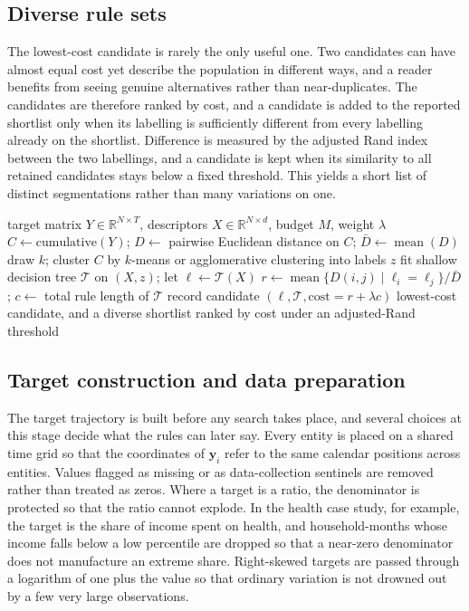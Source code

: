 \subsection{Diverse rule sets}
\label{sec:diversity}

The lowest-cost candidate is rarely the only useful one. Two candidates can have almost equal cost yet describe the population in different ways, and a reader benefits from seeing genuine alternatives rather than near-duplicates. The candidates are therefore ranked by cost, and a candidate is added to the reported shortlist only when its labelling is sufficiently different from every labelling already on the shortlist. Difference is measured by the adjusted Rand index between the two labellings, and a candidate is kept when its similarity to all retained candidates stays below a fixed threshold. This yields a short list of distinct segmentations rather than many variations on one.

\begin{algorithm}[t]
\caption{Rule-based trajectory segmentation}
\label{alg:seal}
\begin{algorithmic}[1]
\Require target matrix $Y \in \mathbb{R}^{N \times T}$, descriptors $X \in \mathbb{R}^{N \times d}$, budget $M$, weight $\lambda$
\State $C \gets \text{cumulative}(Y)$; \quad $D \gets$ pairwise Euclidean distance on $C$; \quad $\bar{D} \gets \operatorname{mean}(D)$
  \State draw $k$; cluster $C$ by $k$-means or agglomerative clustering into labels $z$
  \State fit shallow decision tree $\mathcal{T}$ on $(X, z)$; let $\ell \gets \mathcal{T}(X)$
  \State $r \gets \operatorname{mean}\{ D(i,j) \mid \ell_i = \ell_j \} / \bar{D}$; \quad $c \gets$ total rule length of $\mathcal{T}$
  \State record candidate $(\ell, \mathcal{T}, \text{cost} = r + \lambda c)$
\EndFor
\State \Return lowest-cost candidate, and a diverse shortlist ranked by cost under an adjusted-Rand threshold
\end{algorithmic}
\end{algorithm}

\subsection{Target construction and data preparation}
\label{sec:preprocessing}

The target trajectory is built before any search takes place, and several choices at this stage decide what the rules can later say. Every entity is placed on a shared time grid so that the coordinates of $\mathbf{y}_i$ refer to the same calendar positions across entities. Values flagged as missing or as data-collection sentinels are removed rather than treated as zeros. Where a target is a ratio, the denominator is protected so that the ratio cannot explode. In the health case study, for example, the target is the share of income spent on health, and household-months whose income falls below a low percentile are dropped so that a near-zero denominator does not manufacture an extreme share. Right-skewed targets are passed through a logarithm of one plus the value so that ordinary variation is not drowned out by a few very large observations.

